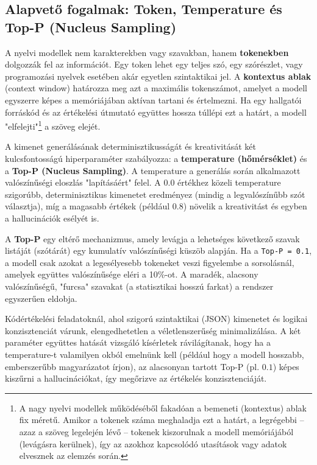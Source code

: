 \documentclass[12pt,a4paper]{article}
\begin{document}
\subsection{Alapvető fogalmak: Token, Temperature és Top-P (Nucleus Sampling)}
A nyelvi modellek nem karakterekben vagy szavakban, hanem \textbf{tokenekben} dolgozzák fel az információt. Egy token lehet egy teljes szó, egy szórészlet, vagy programozási nyelvek esetében akár egyetlen szintaktikai jel. A \textbf{kontextus ablak} (context window) határozza meg azt a maximális tokenszámot, amelyet a modell egyszerre képes a memóriájában aktívan tartani és értelmezni. Ha egy hallgatói forráskód és az értékelési útmutató együttes hossza túllépi ezt a határt, a modell "elfelejti"\footnote{A nagy nyelvi modellek működéséből fakadóan a bemeneti (kontextus) ablak fix méretű. Amikor a tokenek száma meghaladja ezt a határt, a legrégebbi -- azaz a szöveg legelején lévő -- tokenek kiszorulnak a modell memóriájából (levágásra kerülnek), így az azokhoz kapcsolódó utasítások vagy adatok elvesznek az elemzés során.} a szöveg elejét.

A kimenet generálásának determinisztikusságát és kreativitását két kulcsfontosságú hiperparaméter szabályozza: a \textbf{temperature (hőmérséklet)} és a \textbf{Top-P (Nucleus Sampling)}.
A temperature a generálás során alkalmazott valószínűségi eloszlás "lapításáért" felel. A $0.0$ értékhez közeli temperature szigorúbb, determinisztikus kimenetet eredményez (mindig a legvalószínűbb szót választja), míg a magasabb értékek (például $0.8$) növelik a kreativitást és egyben a hallucinációk esélyét is.

A \textbf{Top-P} egy eltérő mechanizmus, amely levágja a lehetséges következő szavak listáját (szótárát) egy kumulatív valószínűségi küszöb alapján. Ha a \texttt{Top-P = 0.1}, a modell csak azokat a legesélyesebb tokeneket veszi figyelembe a sorsolásnál, amelyek együttes valószínűsége eléri a 10\%-ot. A maradék, alacsony valószínűségű, "furcsa" szavakat (a statisztikai hosszú farkat) a rendszer egyszerűen eldobja.

Kódértékelési feladatoknál, ahol szigorú szintaktikai (JSON) kimenetet és logikai konzisztenciát várunk, elengedhetetlen a véletlenszerűség minimalizálása. A két paraméter együttes hatását vizsgáló kísérletek rávilágítanak, hogy ha a temperature-t valamilyen okból emelnünk kell (például hogy a modell hosszabb, emberszerűbb magyarázatot írjon), az alacsonyan tartott Top-P (pl. $0.1$) képes kiszűrni a hallucinációkat, így megőrizve az értékelés konzisztenciáját.
\end{document}
